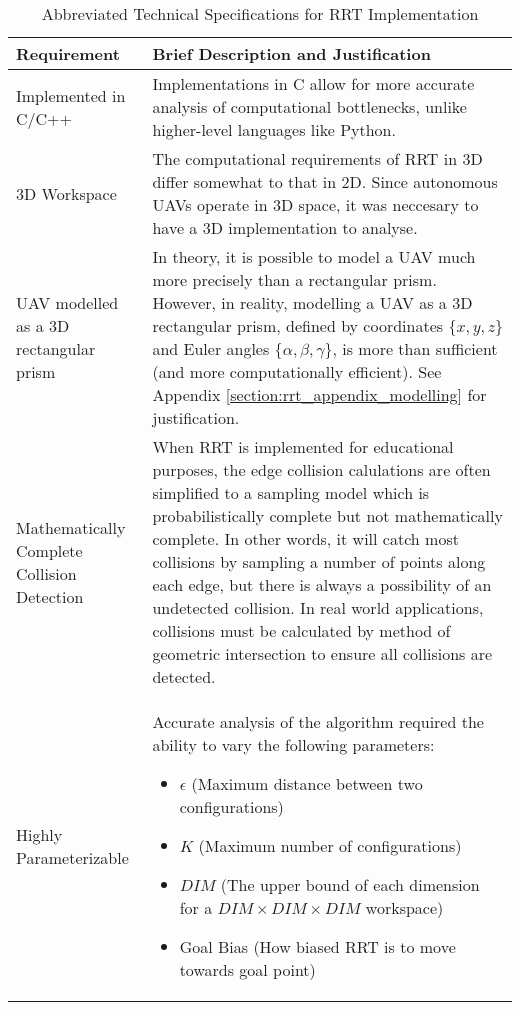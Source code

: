 \begin{table}[H]
\begin{center}
\begin{tabular}{|p{.2\linewidth}|p{.74\linewidth}|}
    \hline
    Requirement             & Brief Description and Justification \\
    \hline
    Implemented in C/C++    & 
        Implementations in C allow for more accurate analysis of computational bottlenecks, unlike higher-level languages like Python. \\
    \hline
    3D Workspace            & 
        The computational requirements of \gls{RRT} in \gls{3D} differ somewhat to that in \gls{2D}. Since autonomous \glspl{UAV} operate in 3D space, it was neccesary to have a \gls{3D} implementation to analyse. \\
    \hline
    \Gls{UAV} modelled as a \gls{3D} rectangular prism  & 
        In theory, it is possible to model a \gls{UAV} much more precisely than a rectangular prism. However, in reality, modelling a \gls{UAV} as a \gls{3D} rectangular prism, defined by coordinates $\{x, y, z\}$ and Euler angles $\{\alpha, \beta, \gamma \}$, is more than sufficient (and more computationally efficient). See Appendix \ref{section:rrt_appendix_modelling} for justification. \\
    \hline
    Mathematically Complete Collision Detection & 
        When \gls{RRT} is implemented for educational purposes, the edge collision calulations are often simplified to a sampling model which is \gls{probabilistically complete} but not \gls{mathematically complete}. In other words, it will catch most collisions by sampling a number of points along each edge, but there is always a possibility of an undetected collision. In real world applications, collisions must be calculated by method of geometric intersection to ensure all collisions are detected. \\
    \hline
    Highly Parameterizable      & 
        Accurate analysis of the algorithm required the ability to vary the following parameters: 
        \begin{itemize}
        \item $\epsilon$ (Maximum distance between two configurations)
        \item $K$ (Maximum number of configurations)
        \item $DIM$ (The upper bound of each dimension for a $DIM\times DIM\times DIM$ workspace)
        \item Goal Bias (How biased RRT is to move towards goal point)
        \end{itemize} \\
    \hline
\end{tabular}
\caption{Abbreviated Technical Specifications for \gls{RRT} Implementation}
\label{table:RRT_Tech_Specs_Abbrev}
\end{center}
\end{table}

